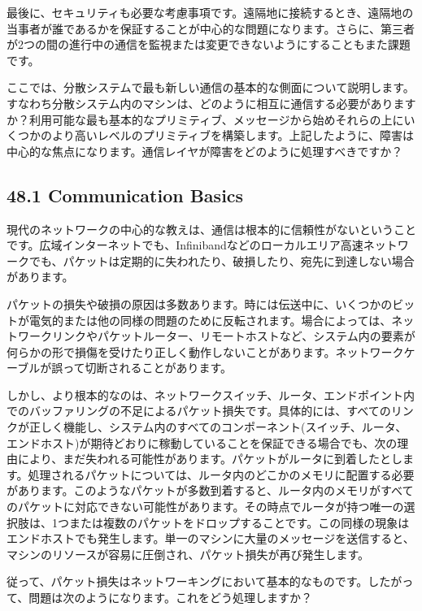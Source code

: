 最後に、セキュリティも必要な考慮事項です。遠隔地に接続するとき、遠隔地の当事者が誰であるかを保証することが中心的な問題になります。さらに、第三者が2つの間の進行中の通信を監視または変更できないようにすることもまた課題です。

ここでは、分散システムで最も新しい通信の基本的な側面について説明します。すなわち分散システム内のマシンは、どのように相互に通信する必要がありますか？利用可能な最も基本的なプリミティブ、メッセージから始めそれらの上にいくつかのより高いレベルのプリミティブを構築します。上記したように、障害は中心的な焦点になります。通信レイヤが障害をどのように処理すべきですか？

\hypertarget{communication-basics}{%
\subsection*{48.1 Communication Basics}\label{communication-basics}}

現代のネットワークの中心的な教えは、通信は根本的に信頼性がないということです。広域インターネットでも、Infinibandなどのローカルエリア高速ネットワークでも、パケットは定期的に失われたり、破損したり、宛先に到達しない場合があります。

パケットの損失や破損の原因は多数あります。時には伝送中に、いくつかのビットが電気的または他の同様の問題のために反転されます。場合によっては、ネットワークリンクやパケットルーター、リモートホストなど、システム内の要素が何らかの形で損傷を受けたり正しく動作しないことがあります。ネットワークケーブルが誤って切断されることがあります。

しかし、より根本的なのは、ネットワークスイッチ、ルータ、エンドポイント内でのバッファリングの不足によるパケット損失です。具体的には、すべてのリンクが正しく機能し、システム内のすべてのコンポーネント(スイッチ、ルータ、エンドホスト)が期待どおりに稼動していることを保証できる場合でも、次の理由により、まだ失われる可能性があります。パケットがルータに到着したとします。処理されるパケットについては、ルータ内のどこかのメモリに配置する必要があります。このようなパケットが多数到着すると、ルータ内のメモリがすべてのパケットに対応できない可能性があります。その時点でルータが持つ唯一の選択肢は、1つまたは複数のパケットをドロップすることです。この同様の現象はエンドホストでも発生します。単一のマシンに大量のメッセージを送信すると、マシンのリソースが容易に圧倒され、パケット損失が再び発生します。

従って、パケット損失はネットワーキングにおいて基本的なものです。したがって、問題は次のようになります。これをどう処理しますか？

